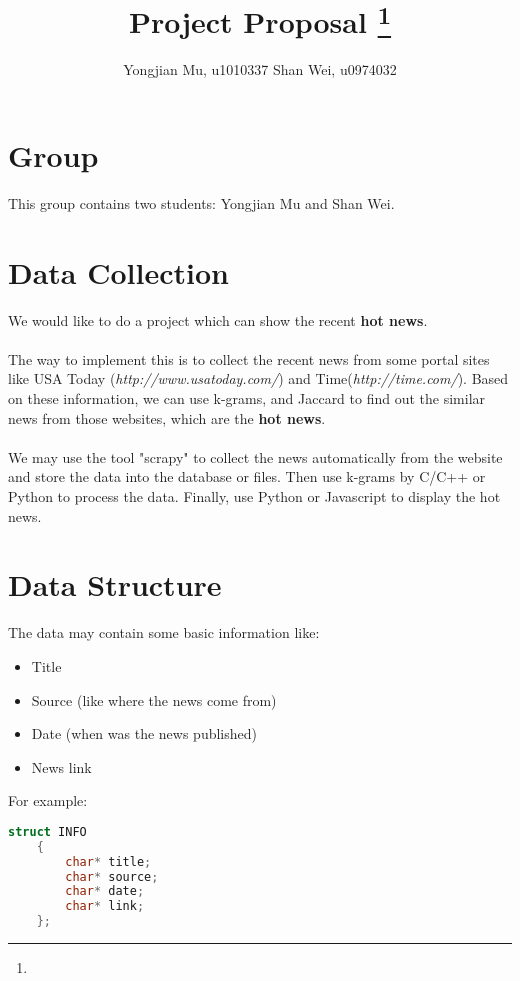 \documentclass[11pt]{article}
\title{Project Proposal
\footnote{\s{CS 6140; \;\; Spring 2016 \hfill
Instructor: Jeff M. Phillips, University of Utah}
}
}
\author{Yongjian Mu, u1010337 \qquad Shan Wei, u0974032}
\begin{document}
\maketitle





\section{Group}
This group contains two students: Yongjian Mu and Shan Wei.

\section{Data Collection}
We would like to do a project which can show the recent \textbf{hot news}.\\
\\
The way to implement this is to collect the recent news from some portal sites like USA Today (\textit{http://www.usatoday.com/}) and Time(\textit{http://time.com/}). Based on these information, we can use k-grams, and Jaccard to find out the similar news from those websites, which are the \textbf{hot news}.\\
\\
We may use the tool "scrapy" to collect the news automatically from the website and store the data into the database or files. Then use k-grams by C/C++ or Python to process the data. Finally, use Python or Javascript to display the hot news.

\section{Data Structure}
The data may contain some basic information like:
\begin{itemize}
\item Title
\item Source (like where the news come from)
\item Date (when was the news published)
\item News link
\end{itemize}

For example:
\begin{lstlisting}[language=C]
    struct INFO
    {
	    char* title;
	    char* source;
	    char* date;
	    char* link;
    };
\end{lstlisting}
\end{document}

